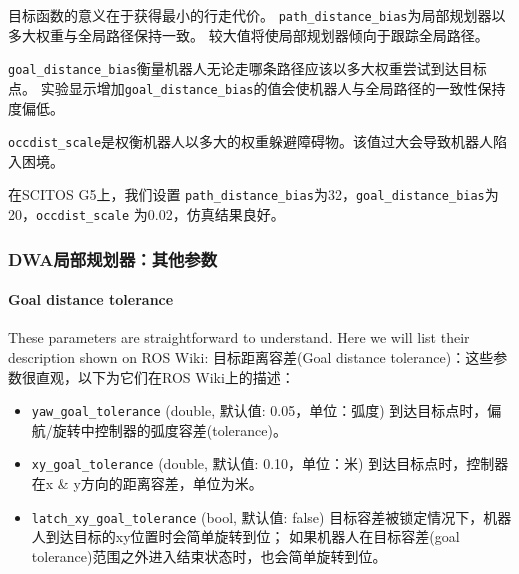 目标函数的意义在于获得最小的行走代价。
\texttt{path\_distance\_bias}为局部规划器以多大权重与全局路径保持一致\cite{furrer2016robot}。
较大值将使局部规划器倾向于跟踪全局路径。

\texttt{goal\_distance\_bias}衡量机器人无论走哪条路径应该以多大权重尝试到达目标点。
实验显示增加\texttt{goal\_distance\_bias}的值会使机器人与全局路径的一致性保持度偏低。


\texttt{occdist\_scale}是权衡机器人以多大的权重躲避障碍物。该值过大会导致机器人陷入困境。

在SCITOS G5上，我们设置 \texttt{path\_distance\_bias}为32，\texttt{goal\_distance\_bias}为20，\texttt{occdist\_scale} 为0.02，仿真结果良好。


\subsubsection[DWA Local Planner: Other Parameters]{DWA局部规划器：其他参数}%

\paragraph{Goal distance tolerance} These parameters are straightforward to understand. Here we will list their description shown on ROS Wiki:
目标距离容差(Goal distance tolerance)：这些参数很直观，以下为它们在ROS Wiki上的描述：

\begin{itemize}
	\item \texttt{yaw\_goal\_tolerance} (double, 默认值: 0.05，单位：弧度)
	到达目标点时，偏航/旋转中控制器的弧度容差(tolerance)。
	
	\item \texttt{xy\_goal\_tolerance} (double, 默认值: 0.10，单位：米)
	到达目标点时，控制器在x \& y方向的距离容差，单位为米。
	
	\item \texttt{latch\_xy\_goal\_tolerance} (bool, 默认值: false) 
	目标容差被锁定情况下，机器人到达目标的xy位置时会简单旋转到位；
	如果机器人在目标容差(goal tolerance)范围之外进入结束状态时，也会简单旋转到位。
	
\end{itemize}


